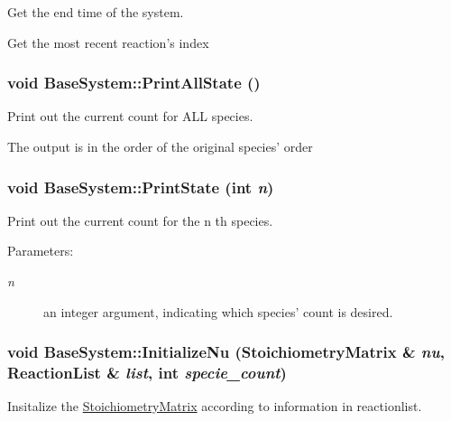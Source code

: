 Get the end time of the system. 

Get the most recent reaction's index \hypertarget{class_base_system_b2ac8b52857e07bef302f8f5636ad6f0}{
\subsubsection{\setlength{\rightskip}{0pt plus 5cm}void BaseSystem::PrintAllState ()}}
\label{class_base_system_b2ac8b52857e07bef302f8f5636ad6f0}


Print out the current count for ALL species. 

The output is in the order of the original species' order \hypertarget{class_base_system_4be2edc5013da51b3e05e9b8dbe82548}{
\subsubsection{\setlength{\rightskip}{0pt plus 5cm}void BaseSystem::PrintState (int {\em n})}}
\label{class_base_system_4be2edc5013da51b3e05e9b8dbe82548}


Print out the current count for the n th species. 

\begin{Desc}
\item[Parameters:]
\begin{description}
\item[{\em n}]an integer argument, indicating which species' count is desired. \end{description}
\end{Desc}
\hypertarget{class_base_system_adc3f9bae0f4abe9cf3d5d09d56b6c65}{
\subsubsection{\setlength{\rightskip}{0pt plus 5cm}void BaseSystem::InitializeNu ({\bf StoichiometryMatrix} \& {\em nu}, \/  {\bf ReactionList} \& {\em list}, \/  int {\em specie\_\-count})}}
\label{class_base_system_adc3f9bae0f4abe9cf3d5d09d56b6c65}


Insitalize the \hyperlink{class_stoichiometry_matrix}{StoichiometryMatrix} according to information in reactionlist. 

